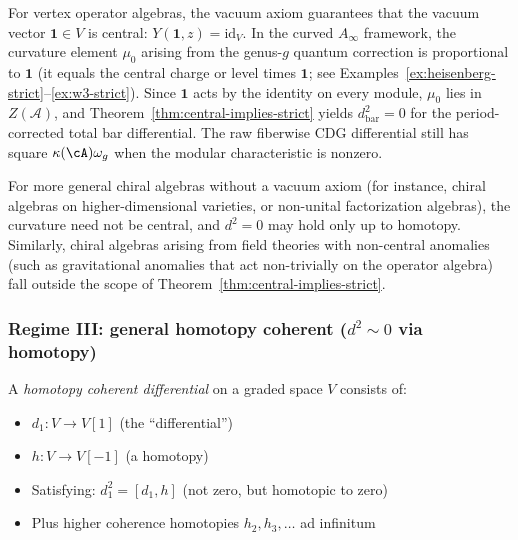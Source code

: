 \begin{remark}\label{rem:voa-central-curvature}
For vertex operator algebras, the vacuum axiom guarantees that the vacuum vector
$\mathbf{1}\in V$ is central: $Y(\mathbf{1},z) = \mathrm{id}_V$. In the curved
$A_\infty$ framework, the curvature element $\mu_0$ arising from the genus-$g$
quantum correction is proportional to $\mathbf{1}$ (it equals the central charge or
level times $\mathbf{1}$; see Examples~\ref{ex:heisenberg-strict}--\ref{ex:w3-strict}).
Since $\mathbf{1}$ acts by the identity on every module, $\mu_0$ lies in $Z(\mathcal{A})$,
and Theorem~\ref{thm:central-implies-strict} yields
$d_{\mathrm{bar}}^2=0$ for the period-corrected total bar
differential. The raw fiberwise CDG differential still has square
$\kappa(\cA)\omega_g$ when the modular characteristic is nonzero.

For more general chiral algebras without a vacuum axiom (for instance, chiral
algebras on higher-dimensional varieties, or non-unital factorization algebras),
the curvature need not be central, and $d^2=0$ may hold only up to homotopy.
Similarly, chiral algebras arising from field theories with non-central anomalies
(such as gravitational anomalies that act non-trivially on the operator algebra)
fall outside the scope of Theorem~\ref{thm:central-implies-strict}.
\end{remark}

\subsubsection{\texorpdfstring{Regime III: general homotopy coherent ($d^2 \sim 0$ via homotopy)}{Regime III: general homotopy coherent (d2 0 via homotopy)}}

\begin{definition}\label{def:homotopy-coherent}
A \emph{homotopy coherent differential} on a graded space $V$ consists of:
\begin{itemize}
\item $d_1: V \to V[1]$ (the ``differential'')
\item $h: V \to V[-1]$ (a homotopy)
\item Satisfying: $d_1^2 = [d_1, h]$ (not zero, but homotopic to zero)
\item Plus higher coherence homotopies $h_2, h_3, \ldots$ ad infinitum
\end{itemize}
\end{definition}

